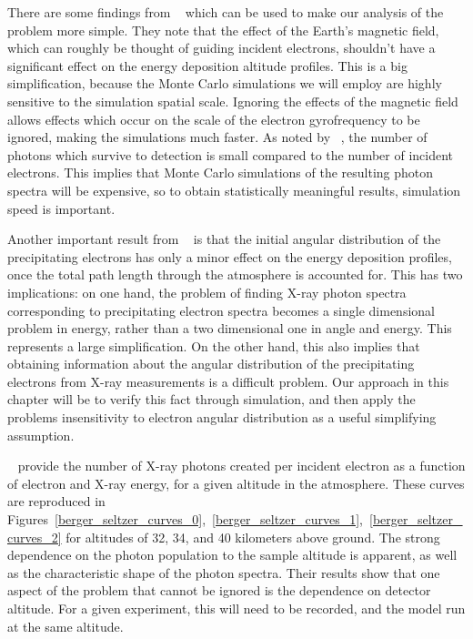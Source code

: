 There are some findings from ~\cite{Rees1963} which can be used to make our analysis of the problem more simple. They note that the effect of the Earth's magnetic field, which can roughly be thought of guiding incident electrons, shouldn't have a significant effect on the energy deposition altitude profiles. This is a big simplification, because the Monte Carlo simulations we will employ are highly sensitive to the simulation spatial scale. Ignoring the effects of the magnetic field allows effects which occur on the scale of the electron gyrofrequency to be ignored, making the simulations much faster. As noted by ~\cite{Berger1972}, the number of photons which survive to detection is small compared to the number of incident electrons. This implies that Monte Carlo simulations of the resulting photon spectra will be expensive, so to obtain statistically meaningful results, simulation speed is important. 

Another important result from ~\cite{Rees1963} is that the initial angular distribution of the precipitating electrons has only a minor effect on the energy deposition profiles, once the total path length through the atmosphere is accounted for. This has two implications: on one hand, the problem of finding X-ray photon spectra corresponding to precipitating electron spectra becomes a single dimensional problem in energy, rather than a two dimensional one in angle and energy. This represents a large simplification. On the other hand, this also implies that obtaining information about the angular distribution of the precipitating electrons from X-ray measurements is a difficult problem. Our approach in this chapter will be to verify this fact through simulation, and then apply the problems insensitivity to electron angular distribution as a useful simplifying assumption. 

~\cite{Berger1972} provide the number of X-ray photons created per incident electron as a function of electron and X-ray energy, for a given altitude in the atmosphere. These curves are reproduced in Figures~\ref{berger_seltzer_curves_0},~\ref{berger_seltzer_curves_1},~\ref{berger_seltzer_curves_2} for altitudes of 32, 34, and 40 kilometers above ground. The strong dependence on the photon population to the sample altitude is apparent, as well as the characteristic shape of the photon spectra. Their results show that one aspect of the problem that cannot be ignored is the dependence on detector altitude. For a given experiment, this will need to be recorded, and the model run at the same altitude. 

